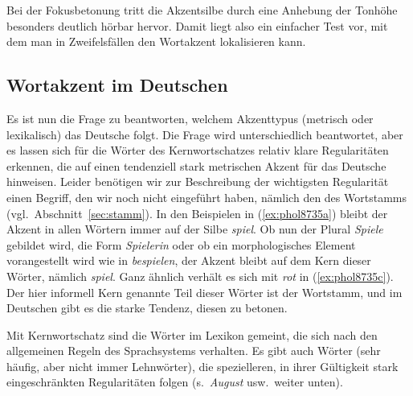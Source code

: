 \begin{exe}
  \ex\label{ex:fokus-deutlich}
  \begin{xlist}
  \end{xlist}
\end{exe}

Bei der Fokusbetonung tritt die Akzentsilbe durch eine Anhebung der Tonhöhe besonders deutlich hörbar hervor.
Damit liegt also ein einfacher Test vor, mit dem man in Zweifelsfällen den Wortakzent lokalisieren kann.

\subsection{Wortakzent im Deutschen}

\label{sec:deutscherwortakzent}

Es ist nun die Frage zu beantworten, welchem Akzenttypus (metrisch oder lexikalisch) das Deutsche folgt.
Die Frage wird unterschiedlich beantwortet, aber es lassen sich für die Wörter des Kernwortschatzes relativ klare Regularitäten erkennen, die auf einen tendenziell stark metrischen Akzent für das Deutsche hinweisen.
Leider benötigen wir zur Beschreibung der wichtigsten Regularität einen Begriff, den wir noch nicht eingeführt haben, nämlich den des \label{abs:3453457}Wortstamms (vgl.\ Abschnitt~\ref{sec:stamm}).
In den Beispielen in (\ref{ex:phol8735a}) bleibt der Akzent in allen Wörtern immer auf der Silbe \textit{spiel}.
Ob nun der Plural \textit{Spiele} gebildet wird, die Form \textit{Spielerin} oder ob ein morphologisches Element vorangestellt wird wie in \textit{bespielen}, der Akzent bleibt auf dem Kern dieser Wörter, nämlich \textit{spiel}.
Ganz ähnlich verhält es sich mit \textit{rot} in (\ref{ex:phol8735c}).
Der hier informell Kern genannte Teil dieser Wörter ist der Wortstamm, und im Deutschen gibt es die starke Tendenz, diesen zu betonen.


Mit Kernwortschatz sind die Wörter im Lexikon gemeint, die sich nach den allgemeinen Regeln des Sprachsystems verhalten.
Es gibt auch Wörter (sehr häufig, aber nicht immer Lehnwörter), die spezielleren, in ihrer Gültigkeit stark eingeschränkten Regularitäten folgen (s.\ \textit{August} usw.\ weiter unten).

